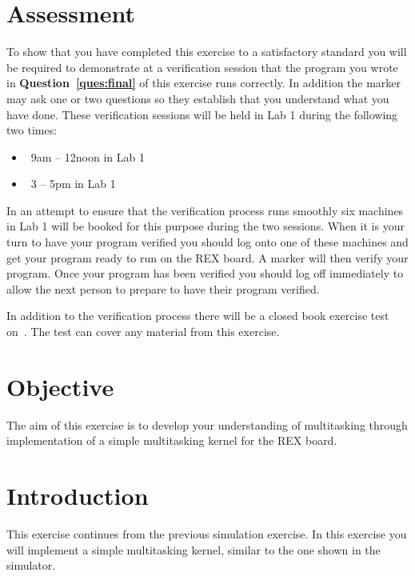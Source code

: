 \documentclass[a4paper,10pt]{article}
\begin{document}

\section{Assessment}

To show that you have completed this exercise to a satisfactory
standard you will be required to demonstrate at a verification session
that the program you wrote in \textbf{Question~\ref{ques:final}} of
this exercise runs correctly. In addition the marker may ask one or
two questions so they establish that you understand what you have
done.  These verification sessions will be held in Lab 1 during the
following two times:

\begin{itemize}
\item \KERNDUE~9am -- 12noon in Lab 1
\item \KERNDUE~3 -- 5pm in Lab 1
\end{itemize}

In an attempt to ensure that the verification process runs smoothly
six machines in Lab 1 will be booked for this purpose during the two
sessions. When it is your turn to have your program verified you
should log onto one of these machines and get your program ready to
run on the REX board. A marker will then verify your program. Once
your program has been verified you should log off immediately to allow
the next person to prepare to have their program verified.

In addition to the verification process there will be a closed book
exercise test on~\textbf{\KERNTEST}. The test can cover any material
from this exercise.

\section{Objective}

The aim of this exercise is to develop your understanding of
multitasking through implementation of a simple multitasking kernel
for the REX board.

\section{Introduction}

This exercise continues from the previous simulation exercise. In this
exercise you will implement a simple multitasking kernel, similar to
the one shown in the simulator.
\end{document}
